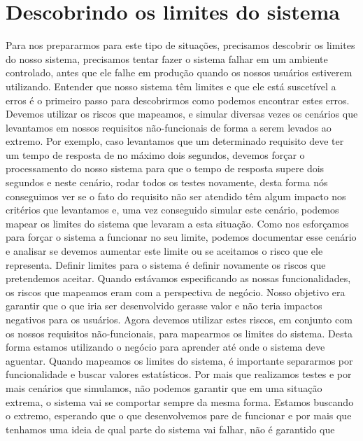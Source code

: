     \section{Descobrindo os limites do sistema}
      Para nos prepararmos para este tipo de situações, precisamos descobrir os
      limites do nosso sistema, precisamos tentar fazer o sistema falhar em um
      ambiente controlado, antes que ele falhe em produção quando os nossos usuários
      estiverem utilizando. Entender que nosso sistema têm limites e que ele está
      suscetível a erros é o primeiro passo para descobrirmos como podemos encontrar
      estes erros. Devemos utilizar os riscos que mapeamos, e simular diversas vezes
      os cenários que levantamos em nossos requisitos não-funcionais de forma a
      serem levados ao extremo. Por exemplo, caso levantamos que um determinado
      requisito deve ter um tempo de resposta de no máximo dois segundos, devemos
      forçar o processamento do nosso sistema para que o tempo de resposta supere
      dois segundos e neste cenário, rodar todos os testes novamente, desta forma nós
      conseguimos ver se o fato do requisito não ser atendido têm algum impacto nos
      critérios que levantamos e, uma vez conseguido simular este cenário, podemos
      mapear os limites do sistema que levaram a esta situação. Como nos esforçamos
      para forçar o sistema a funcionar no seu limite, podemos documentar esse cenário
      e analisar se devemos aumentar este limite ou se aceitamos o risco que ele
      representa. Definir limites para o sistema é definir novamente os riscos que
      pretendemos aceitar. Quando estávamos especificando as nossas funcionalidades,
      os riscos que mapeamos eram com a perspectiva de negócio. Nosso objetivo era
      garantir que o que iria ser desenvolvido gerasse valor e não teria impactos
      negativos para os usuários. Agora devemos utilizar estes riscos, em conjunto
      com os nossos requisitos não-funcionais, para mapearmos os limites do sistema.
      Desta forma estamos utilizando o negócio para aprender até onde o sistema
      deve aguentar. \newline
      Quando mapeamos os limites do sistema, é importante separarmos por funcionalidade
      e buscar valores estatísticos. Por mais que realizamos testes e por mais
      cenários que simulamos, não podemos garantir que em uma situação extrema,
      o sistema vai se comportar sempre da mesma forma. Estamos buscando o
      extremo, esperando que o que desenvolvemos pare de funcionar e por mais que
      tenhamos uma ideia de qual parte do sistema vai falhar, não é garantido que

